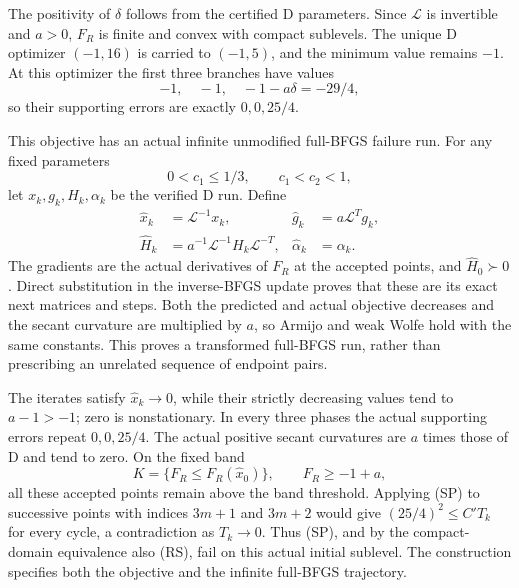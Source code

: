 The positivity of $\delta$ follows from the certified D parameters. Since $\mathcal L$ is invertible and $a>0$, $F_R$ is finite and convex with compact sublevels. The unique D optimizer $(-1,16)$ is carried to $(-1,5)$, and the minimum value remains $-1$. At this optimizer the first three branches have values
\[
 -1,\quad-1,\quad -1-a\delta=-29/4,
\]
so their supporting errors are exactly $0,0,25/4$.

This objective has an actual infinite unmodified full-BFGS failure run. For any fixed parameters
\[
 0<c_1\le1/3,\qquad c_1<c_2<1,
\]
let $x_k,g_k,H_k,\alpha_k$ be the verified D run. Define
\[
 \begin{aligned}
 \widehat x_k&=\mathcal L^{-1}x_k,&
 \widehat g_k&=a\mathcal L^Tg_k,\\
 \widehat H_k&=a^{-1}\mathcal L^{-1}H_k\mathcal L^{-T},&
 \widehat\alpha_k&=\alpha_k.
 \end{aligned}
\]
The gradients are the actual derivatives of $F_R$ at the accepted points, and $\widehat H_0\succ0$. Direct substitution in the inverse-BFGS update proves that these are its exact next matrices and steps. Both the predicted and actual objective decreases and the secant curvature are multiplied by $a$, so Armijo and weak Wolfe hold with the same constants. This proves a transformed full-BFGS run, rather than prescribing an unrelated sequence of endpoint pairs.

The iterates satisfy $\widehat x_k\to0$, while their strictly decreasing values tend to $a-1>-1$; zero is nonstationary. In every three phases the actual supporting errors repeat $0,0,25/4$. The actual positive secant curvatures are $a$ times those of D and tend to zero. On the fixed band
\[
 K=\{F_R\le F_R(\widehat x_0)\},\qquad
 F_R\ge -1+a,
\]
all these accepted points remain above the band threshold. Applying (SP) to successive points with indices $3m+1$ and $3m+2$ would give $(25/4)^2\le C'T_k$ for every cycle, a contradiction as $T_k\to0$. Thus (SP), and by the compact-domain equivalence also (RS), fail on this actual initial sublevel. The construction specifies both the objective and the infinite full-BFGS trajectory.


\setcounter{section}{4}
\setcounter{theorem}{0}
\setcounter{equation}{8}
